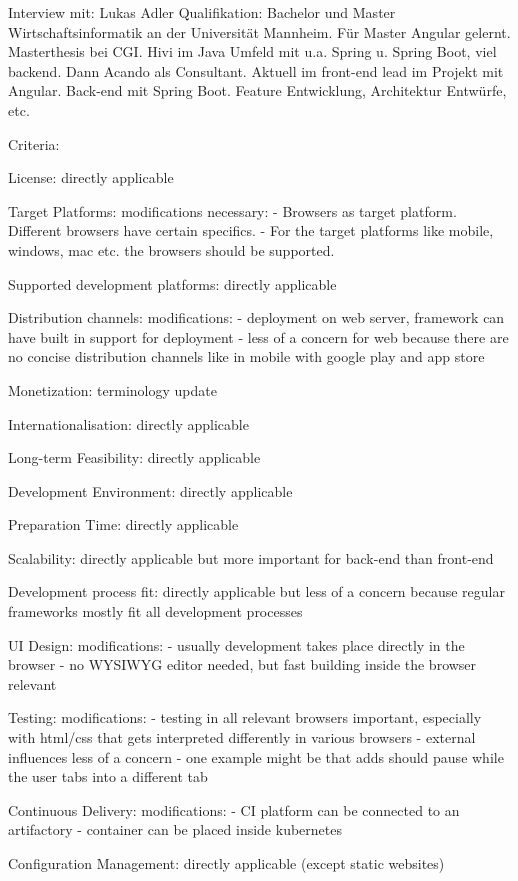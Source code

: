 Interview mit: Lukas Adler
Qualifikation: 
Bachelor und Master Wirtschaftsinformatik an der Universität Mannheim.
Für Master Angular gelernt. Masterthesis bei CGI.
Hivi im Java Umfeld mit u.a. Spring u. Spring Boot, viel backend.
Dann Acando als Consultant.
Aktuell im front-end lead im Projekt mit Angular. Back-end mit Spring Boot.
Feature Entwicklung, Architektur Entwürfe, etc.

Criteria: 

License: 
directly applicable

Target Platforms: 
modifications necessary: 
- Browsers as target platform. Different browsers have certain specifics.
- For the target platforms like mobile, windows, mac etc. the browsers should be supported.

Supported development platforms: 
directly applicable

Distribution channels:
modifications: 
- deployment on web server, framework can have built in support for deployment
- less of a concern for web because there are no concise distribution channels like in mobile with google play and app store

Monetization: 
terminology update

Internationalisation: 
directly applicable

Long-term Feasibility: 
directly applicable

Development Environment:
directly applicable

Preparation Time: 
directly applicable

Scalability: 
directly applicable but more important for back-end than front-end

Development process fit: 
directly applicable but less of a concern because regular frameworks mostly fit all development processes

UI Design: 
modifications: 
- usually development takes place directly in the browser
- no WYSIWYG editor needed, but fast building inside the browser relevant

Testing: 
modifications: 
- testing in all relevant browsers important, especially with html/css that gets interpreted differently in various browsers
- external influences less of a concern
- one example might be that adds should pause while the user tabs into a different tab

Continuous Delivery: 
modifications: 
- CI platform can be connected to an artifactory
- container can be placed inside kubernetes

Configuration Management: 
directly applicable (except static websites)

